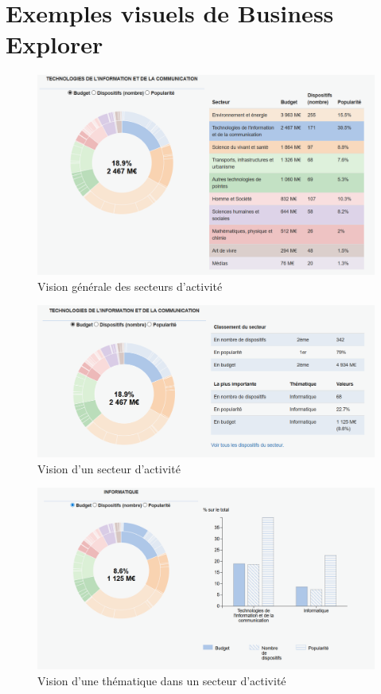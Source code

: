 \appendix
\chapter{Exemples visuels de Business Explorer}
\begin{figure}[h]
\begin{center}
\includegraphics[scale=0.6]{resources/annexe_1.png}
\caption{Vision générale des secteurs d'activité}
\end{center}
\end{figure}

\begin{figure}
\begin{center}
\includegraphics[scale=0.6]{resources/annexe_2.png}
\caption{Vision d'un secteur d'activité}
\end{center}
\end{figure}

\begin{figure}
\begin{center}
\includegraphics[scale=0.6]{resources/annexe_3.png}
\caption{Vision d'une thématique dans un secteur d'activité}
\end{center}
\end{figure}
